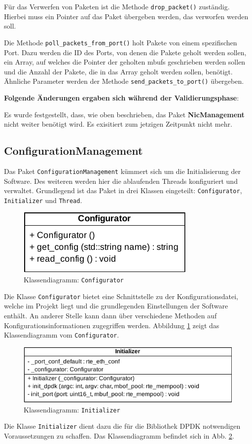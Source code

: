 \documentclass[../review_3.tex]{subfiles}
\begin{document}
Für das Verwerfen von Paketen ist die Methode \texttt{drop\_packet()} zuständig. Hierbei muss ein Pointer auf das Paket übergeben werden, das verworfen werden soll.

Die Methode  \texttt{poll\_packets\_from\_port()} holt Pakete von einem spezifischen Port. Dazu werden die ID des Ports, von denen die Pakete geholt werden sollen, ein Array, auf welches die Pointer der geholten mbufs geschrieben werden sollen und die Anzahl der Pakete, die in das Array geholt werden sollen, benötigt.
Ähnliche Parameter werden der Methode \texttt{send\_packets\_to\_port()} übergeben.

\textbf{Folgende Änderungen ergaben sich während der Validierungsphase}:

Es wurde festgestellt, dass, wie oben beschrieben, das Paket \textbf{NicManagement} nicht weiter benötigt wird. Es exisitiert zum jetzigen Zeitpunkt nicht mehr.

\subsection{ConfigurationManagement}
Das Paket \texttt{ConfigurationManagement} kümmert sich um die Initialisierung der Software. Des weiteren werden hier die ablaufenden Threads konfiguriert und verwaltet. Grundlegend ist das Paket in drei Klassen eingeteilt: \texttt{Configurator}, \texttt{Initializer} und \texttt{Thread}.

\begin{figure}[h]
    \centering
    \includegraphics[width=0.4\linewidth]{img/configurator.pdf}
    \caption{Klassendiagramm: \texttt{Configurator}}
    \label{config}
\end{figure}
Die Klasse \texttt{Configurator} bietet eine Schnittstelle zu der Konfigurationsdatei, welche im Projekt liegt und die grundlegenden Einstellungen der Software enthält. An anderer Stelle kann dann über verschiedene Methoden auf Konfigurationsinformationen zugegriffen werden. Abbildung \ref{config} zeigt das Klassendiagramm vom \texttt{Configurator}.

\begin{figure}[h]
    \centering
    \includegraphics[width=0.7\linewidth]{img/Initializer.pdf}
    \caption{Klassendiagramm: \texttt{Initializer}}
    \label{init}
\end{figure}
Die Klasse \texttt{Initializer} dient dazu die für die Bibliothek DPDK notwendigen Voraussetzungen zu schaffen. Das Klassendiagramm befindet sich in Abb. \ref{init}.
\end{document}
